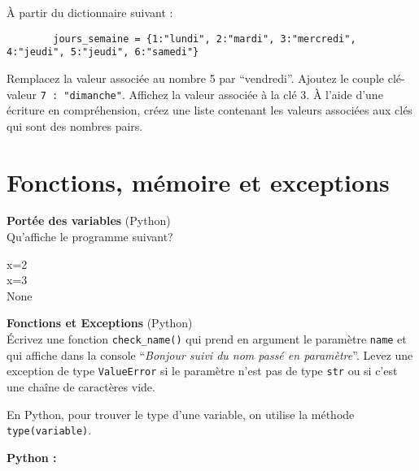 \begin{Exercice}[5 minutes]
    À partir du dictionnaire suivant :
    \begin{lstlisting}
        jours_semaine = {1:"lundi", 2:"mardi", 3:"mercredi", 4:"jeudi", 5:"jeudi", 6:"samedi"} \end{lstlisting}

    Remplacez la valeur associée au nombre 5 par ``vendredi''. Ajoutez le couple clé-valeur \lstinline{7 : "dimanche"}. Affichez la valeur associée à la clé 3.
    À l'aide d'une écriture en compréhension, créez une liste contenant les valeurs associées aux clés qui sont des nombres pairs.

    \begin{solution}
        
    \end{solution}
\end{Exercice}


\section{Fonctions, mémoire et exceptions}
\begin{Exercice}[5 minutes] \textbf{Portée des variables} (Python)\\
    Qu'affiche le programme suivant? \\

    

    \begin{solution}
            x=2 \\
            x=3 \\
            None
    \end{solution}

    
 \end{Exercice}

 \begin{Exercice}[10 minutes]\textbf{Fonctions et Exceptions} (Python)\\
    Écrivez une fonction \lstinline{check_name()} qui prend en argument le paramètre \lstinline{name} et qui affiche dans la console ``\textit{Bonjour suivi du nom passé en paramètre}''.
    Levez une exception de type \lstinline{ValueError} si le paramètre n'est pas de type \lstinline{str} ou si c'est une chaîne de caractères vide.

    \begin{conseil}
        En Python, pour trouver le type d'une variable, on utilise la méthode \lstinline{type(variable)}.
    \end{conseil}
    
    \begin{solution}   
        \textbf{Python :}
        
    \end{solution}
    
    \end{Exercice}

